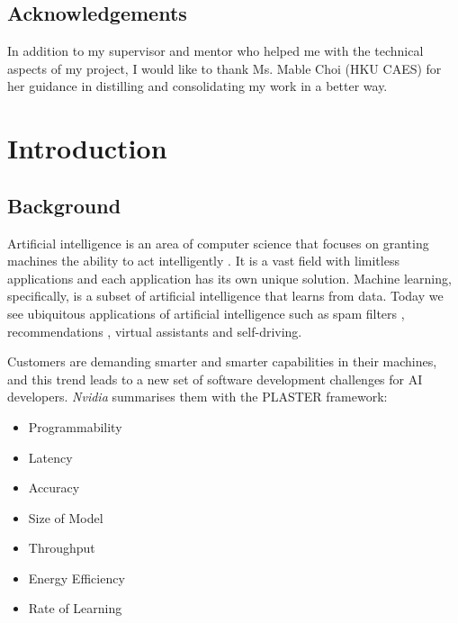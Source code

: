 \documentclass{report}
\def\mainmatter{%
    \pagenumbering{arabic}
    \setcounter{page}{1}
    \setcounter{section}{0}
    \renewcommand{\thesection}{\thechapter.\arabic{section}}
}%
\begin{document}
\section*{Acknowledgements}
In addition to my supervisor and mentor who helped me with the technical aspects of my project, I would like to thank Ms. Mable Choi (HKU CAES) for her guidance in distilling and consolidating my work in a better way.

\setcounter{page}{2}
\tableofcontents

\newpage
{}
\listoffigures

\newpage
{}
\listoftables

\newpage
\mainmatter

\chapter{Introduction}

\section{Background}
Artificial intelligence is an area of computer science that focuses on granting machines the ability to act intelligently \cite{McCarthy2007}.
It is a vast field with limitless applications and each application has its own unique solution.
Machine learning, specifically, is a subset of artificial intelligence that learns from data. \cite{Mitchell1997}
Today we see ubiquitous applications of artificial intelligence such as spam filters \cite{Androutsopoulos2000},  recommendations \cite{lekakos2008hybrid}, virtual assistants and self-driving.

Customers are demanding smarter and smarter capabilities in their machines, and this trend leads to a new set of software development challenges for AI developers. \textit{Nvidia} summarises them with the PLASTER \cite{Teich2018} framework:
\begin{itemize}
  \item Programmability
  \item Latency
  \item Accuracy
  \item Size of Model
  \item Throughput
  \item Energy Efficiency
  \item Rate of Learning
\end{itemize}
\end{document}
